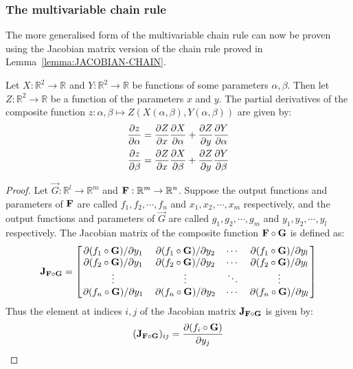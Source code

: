 \subsubsection{The multivariable chain rule}\label{section:MVCR}
The more generalised form of the multivariable chain rule can now be proven using the Jacobian matrix version of the chain rule proved in Lemma~\ref{lemma:JACOBIAN-CHAIN}.
\begin{lemma}
    Let $X:\mathbb{R}^2\rightarrow\mathbb{R}$ and $Y:\mathbb{R}^2\rightarrow\mathbb{R}$ be functions of some parameters $\alpha,\beta$. Then let $Z:\mathbb{R}^2\rightarrow\mathbb{R}$
    be a function of the parameters $x$ and $y$. The partial derivatives of the composite function $z:\alpha,\beta\mapsto Z(X(\alpha,\beta),Y(\alpha,\beta))$ are given by:
    \begin{align*}
        \pdv{z}{\alpha}&=\pdv{Z}{x}\pdv{X}{\alpha}+\pdv{Z}{y}\pdv{Y}{\alpha}\\
        \pdv{z}{\beta}&=\pdv{Z}{x}\pdv{X}{\beta}+\pdv{Z}{y}\pdv{Y}{\beta}
    \end{align*}
    \begin{proof}
        Let $\vec{G}:\mathbb{R}^l\rightarrow\mathbb{R}^m$ and $\mathbf{F}:\mathbb{R}^m\rightarrow\mathbb{R}^n$. Suppose the output functions and parameters of $\mathbf{F}$ are called $f_1,f_2,\cdots,f_n$
        and $x_1,x_2,\cdots,x_m$ respectively, and the output functions and parameters of $\vec{G}$ are called $g_1,g_2,\cdots,g_m$ and $y_1,y_2,\cdots,y_l$ respectively. The Jacobian matrix of
        the composite function $\mathbf{F}\circ\mathbf{G}$ is defined as:
        $$
            \mathbf{J}_{\mathbf{F}\circ\mathbf{G}}=\begin{bmatrix}
                \pdv*{(f_1\circ\mathbf{G})}{y_1} & \pdv*{(f_1\circ\mathbf{G})}{y_2} & \cdots & \pdv*{(f_1\circ\mathbf{G})}{y_l}\\
                \pdv*{(f_2\circ\mathbf{G})}{y_1} & \pdv*{(f_2\circ\mathbf{G})}{y_2} & \cdots & \pdv*{(f_2\circ\mathbf{G})}{y_l}\\
                \vdots & \vdots & \ddots & \vdots \\
                \pdv*{(f_n\circ\mathbf{G})}{y_1} & \pdv*{(f_n\circ\mathbf{G})}{y_2} & \cdots & \pdv*{(f_n\circ\mathbf{G})}{y_l}\\
            \end{bmatrix}
        $$
        Thus the element at indices $i,j$ of the Jacobian matrix $\mathbf{J}_{\mathbf{F}\circ\mathbf{G}}$ is given by:
        $$
            (\mathbf{J}_{\mathbf{F}\circ\mathbf{G}})_{ij}=\pdv{(f_i\circ\mathbf{G})}{y_j}\\
$$
\end{proof}
\end{lemma}
